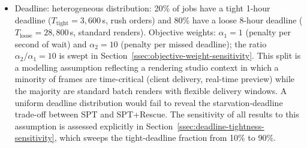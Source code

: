 {\begin{itemize}
  \item Deadline: heterogeneous distribution: 20\% of jobs have a tight 1-hour deadline ($T_{\text{tight}}=3{,}600$\,s, rush orders) and 80\% have a loose 8-hour deadline ($T_{\text{loose}}=28{,}800$\,s, standard renders). Objective weights: $\alpha_1 = 1$ (penalty per second of wait) and $\alpha_2 = 10$ (penalty per missed deadline); the ratio $\alpha_2/\alpha_1 = 10$ is swept in Section~\ref{ssec:objective-weight-sensitivity}. This split is a modelling assumption reflecting a rendering studio context in which a minority of frames are time-critical (client delivery, real-time preview) while the majority are standard batch renders with flexible delivery windows. A uniform deadline distribution would fail to reveal the starvation-deadline trade-off between SPT and SPT+Rescue. The sensitivity of all results to this assumption is assessed explicitly in Section~\ref{ssec:deadline-tightness-sensitivity}, which sweeps the tight-deadline fraction from 10\% to 90\%.

\end{itemize}}
